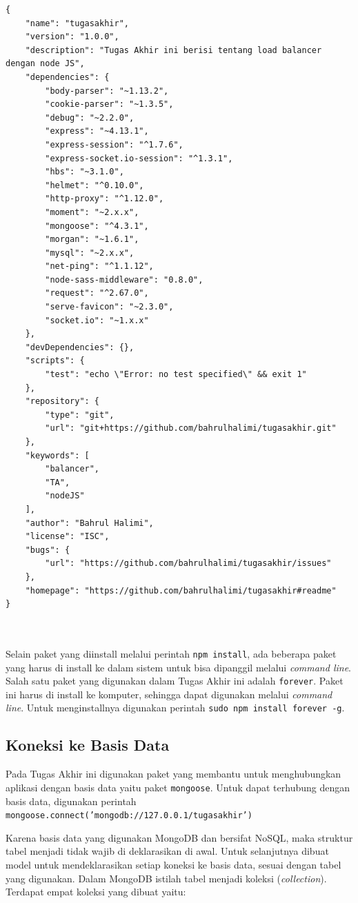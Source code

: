 \documentclass{ta-its}
\begin{document}
			\begin{lstlisting}[frame=single,tabsize=2,breaklines,caption={Isi Package.Json},label=packageJson]
{
	"name": "tugasakhir",
	"version": "1.0.0",
	"description": "Tugas Akhir ini berisi tentang load balancer dengan node JS",
	"dependencies": {
		"body-parser": "~1.13.2",
		"cookie-parser": "~1.3.5",
		"debug": "~2.2.0",
		"express": "~4.13.1",
		"express-session": "^1.7.6",
		"express-socket.io-session": "^1.3.1",
		"hbs": "~3.1.0",
		"helmet": "^0.10.0",
		"http-proxy": "^1.12.0",
		"moment": "~2.x.x",
		"mongoose": "^4.3.1",
		"morgan": "~1.6.1",
		"mysql": "~2.x.x",
		"net-ping": "^1.1.12",
		"node-sass-middleware": "0.8.0",
		"request": "^2.67.0",
		"serve-favicon": "~2.3.0",
		"socket.io": "~1.x.x"
	},
	"devDependencies": {},
	"scripts": {
		"test": "echo \"Error: no test specified\" && exit 1"
	},
	"repository": {
		"type": "git",
		"url": "git+https://github.com/bahrulhalimi/tugasakhir.git"
	},
	"keywords": [
		"balancer",
		"TA",
		"nodeJS"
	],
	"author": "Bahrul Halimi",
	"license": "ISC",
	"bugs": {
		"url": "https://github.com/bahrulhalimi/tugasakhir/issues"
	},
	"homepage": "https://github.com/bahrulhalimi/tugasakhir#readme"
}

				
			\end{lstlisting}
			
				Selain paket yang diinstall melalui perintah \texttt{npm install}, ada beberapa paket yang harus di install ke dalam sistem untuk bisa dipanggil melalui \textit{command line}. Salah satu paket yang digunakan dalam Tugas Akhir ini adalah \texttt{forever}. Paket ini harus di install ke komputer, sehingga dapat digunakan melalui \textit{command line}. Untuk menginstallnya digunakan perintah \texttt{sudo npm install forever -g}.
        
	        \subsection{Koneksi ke Basis Data}
		        Pada Tugas Akhir ini digunakan paket yang membantu untuk menghubungkan aplikasi dengan basis data yaitu paket \texttt{mongoose}. Untuk dapat terhubung dengan basis data, digunakan perintah \texttt{mongoose.connect('mongodb://127.0.0.1/tugasakhir')}
		        
		        Karena basis data yang digunakan MongoDB dan bersifat NoSQL, maka struktur tabel menjadi tidak wajib di deklarasikan di awal. Untuk selanjutnya dibuat model untuk mendeklarasikan setiap koneksi ke basis data, sesuai dengan tabel yang digunakan. Dalam MongoDB istilah tabel menjadi koleksi (\textit{collection}). Terdapat empat koleksi yang dibuat yaitu:
		        
\end{document}
